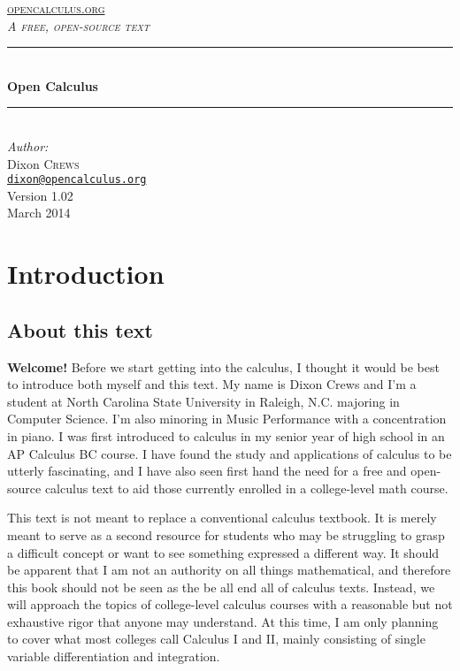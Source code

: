 \documentclass[oneside]{article}
\begin{document}
\begin{titlepage}

\newcommand{\HRule}{\rule{\linewidth}{0.5mm}} 

\center

\textsc{\large \href{http://opencalculus.org}{opencalculus.org}}\\[1.5cm] 
\textsc{\Large \textit{A free, open-source text}}\\[0.5cm] 

\HRule \\[0.4cm]
{ \huge \bfseries Open Calculus}\\[0.4cm]
\HRule \\[1.5cm]

\Large \emph{Author:}\\
Dixon \textsc{Crews}\\[0.5cm]
\small \texttt{\href{mailto:dixon@opencalculus.org}{dixon@opencalculus.org}} \\ [3.5cm]

{\large Version 1.02}\\[1cm]
{\large March 2014}\\[3cm]

\vfill 

\end{titlepage}

\tableofcontents

\newpage

\section{Introduction}
\subsection{About this text}
\textbf{Welcome!} Before we start getting into the calculus, I thought it would be best to introduce both myself and this text. My name is Dixon Crews and I'm a student at North Carolina State University in Raleigh, N.C. majoring in Computer Science. I'm also minoring in Music Performance with a concentration in piano. I was first introduced to calculus in my senior year of high school in an AP Calculus BC course. I have found the study and applications of calculus to be utterly fascinating, and I have also seen first hand the need for a free and open-source calculus text to aid those currently enrolled in a college-level math course.

This text is not meant to replace a conventional calculus textbook. It is merely meant to serve as a second resource for students who may be struggling to grasp a difficult concept or want to see something expressed a different way. It should be apparent that I am not an authority on all things mathematical, and therefore this book should not be seen as the be all end all of calculus texts. Instead, we will approach the topics of college-level calculus courses with a reasonable but not exhaustive rigor that anyone may understand. At this time, I am only planning to cover what most colleges call Calculus I and II, mainly consisting of single variable differentiation and integration.
\end{document}
